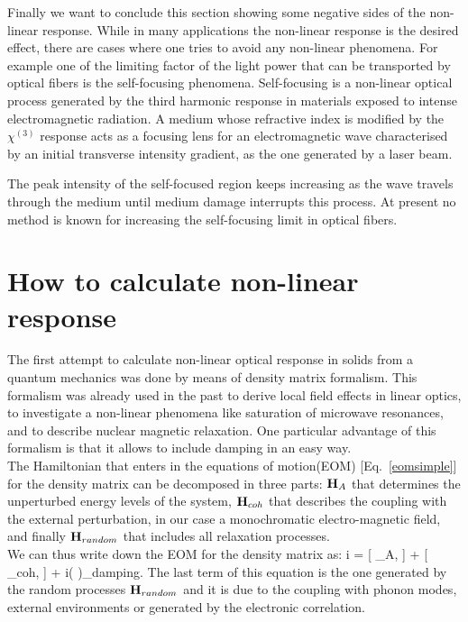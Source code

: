 Finally we want to conclude this section showing some negative sides of the non-linear response. While in many applications the non-linear response is the desired effect, there are cases where one tries to avoid any non-linear phenomena. 
For example one of the limiting factor of the light power that can be transported by optical fibers is the self-focusing phenomena. Self-focusing is a non-linear optical process generated by the third harmonic response in materials exposed to intense electromagnetic radiation. 
A medium whose refractive index is modified by the $\chi^{(3)}$ response acts as a focusing lens for an electromagnetic wave characterised by an initial transverse intensity gradient, as the one generated by a laser beam. %


The peak intensity of the self-focused region keeps increasing as the wave travels through the medium until medium damage interrupts this process. At present no method is known for increasing the self-focusing limit in optical fibers\cite{encylaser}.\\
\section{How to calculate non-linear response}
The first attempt to calculate non-linear optical response in solids from a quantum mechanics was done by means of density matrix formalism.\cite{bloembergen1964quantum} This formalism was already used in the past to derive local field effects in linear optics\cite{PhysRev.126.413,wiser1963dielectric}, to investigate  a non-linear phenomena like saturation of microwave resonances\cite{karplus1948note}, and to describe nuclear magnetic relaxation\cite{kubo1954general,RevModPhys.33.249,PhysRev.102.104}.              
One particular advantage of this formalism is that it allows to include damping in an easy way.\\  
The Hamiltonian that enters in the equations of motion(EOM) [Eq.~\ref{eomsimple}] for the density matrix\cite{neumann} can be decomposed in three parts:   ${\bf H}_A$ that determines the unperturbed energy levels of the system, ${\bf H}_{coh}$ that describes the coupling  with the external perturbation, in our case a monochromatic electro-magnetic field, and finally ${\bf H}_{random}$ that includes all relaxation processes.\\
We can thus write down the EOM for the density matrix as:
\be
i \hbar {} = [ \HH_A, \rho] + [ \HH_{coh}, \rho] + i\hbar \left (  \right )_{damping}.
\label{eomsimple}
\ee
The last term of this equation is the one generated by the random processes  ${\bf H}_{random}$ and it is due to the coupling with phonon modes, external environments or generated by the electronic correlation. 

